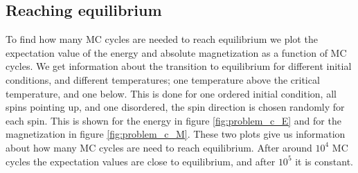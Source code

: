 \documentclass[%
 reprint,
nofootinbib,
aps,
]{revtex4-1}
\begin{document}
\subsection{Reaching equilibrium}
To find how many MC cycles are needed to reach equilibrium we plot the expectation value of the energy and absolute magnetization as a function of MC cycles. We get information about the transition to equilibrium for different initial conditions, and different temperatures; one temperature above the critical temperature, and one below. This is done for one ordered initial condition, all spins pointing up, and one disordered, the spin direction is chosen randomly for each spin. This is shown for the energy in figure \vref{fig:problem_c_E} and for the magnetization in figure \vref{fig:problem_c_M}. These two plots give us information about how many MC cycles are need to reach equilibrium. After around $10^4$ MC cycles the expectation values are close to equilibrium, and after $10^5$ it is constant.
\end{document}
